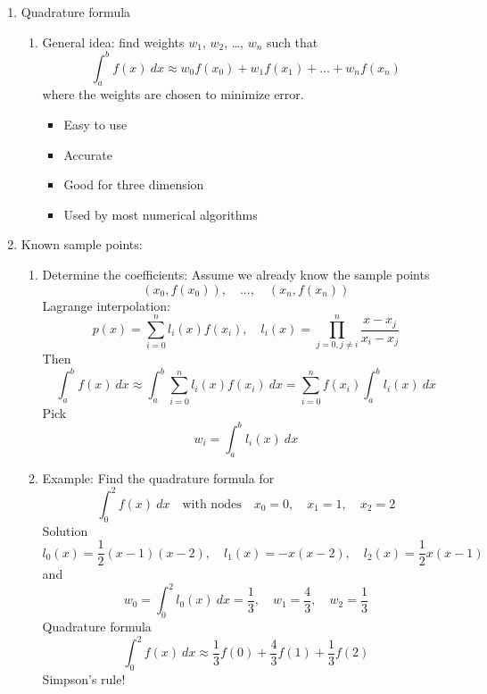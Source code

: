 \documentclass{article}
\theoremstyle{remark}
\begin{document}
\begin{enumerate}
\item Quadrature formula

\begin{enumerate}
\item General idea: find weights $w_1$, $w_2$, \dots, $w_n$ such that
$$
\int_a^bf(x)~dx \approx w_0f(x_0)+w_1f(x_1)+\dots+w_nf(x_n)
$$
where the weights are chosen to minimize error.
\begin{itemize}
\item Easy to use
\item Accurate 
\item Good for three dimension
\item Used by most numerical algorithms
\end{itemize}
\end{enumerate}


\item Known sample points:
\begin{enumerate}
\item Determine the coefficients: Assume we already know the sample points
$$
(x_0,f(x_0)),\quad ...,\quad (x_n,f(x_n))
$$
Lagrange interpolation: 
$$
p(x) = \sum_{i=0}^nl_i(x)f(x_i),\quad l_i(x) = \prod_{j=0,j\neq i}^n\frac{x-x_j}{x_i-x_j}
$$
Then
$$
\int_a^b f(x)~dx \approx \int_a^b\sum_{i=0}^nl_i(x)f(x_i)~dx = \sum_{i=0}^n f(x_i)\int_a^bl_i(x)~dx
$$
Pick
$$
w_i = \int_a^bl_i(x)~dx
$$

\item Example: Find the quadrature formula for 
$$
\int_{0}^2f(x)~dx\quad\text{with nodes}\quad x_0 = 0,\quad x_1 = 1,\quad x_2 = 2
$$
Solution
$$
l_0(x) =\frac{1}{2}(x-1)(x-2),\quad l_1(x) = -x(x-2),\quad l_2(x) = \frac{1}{2}x(x-1)
$$
and
$$
w_0 = \int_{0}^2 l_0(x)~dx = \frac{1}{3}, \quad w_1 = \frac{4}{3}, \quad w_2 = \frac{1}{3}
$$
Quadrature formula
$$
\int_{0}^2f(x)~dx\approx \frac{1}{3}f(0) +\frac{4}{3}f(1) + \frac{1}{3}f(2)
$$
Simpson's rule!
\end{enumerate}


\end{enumerate}
\end{document}
